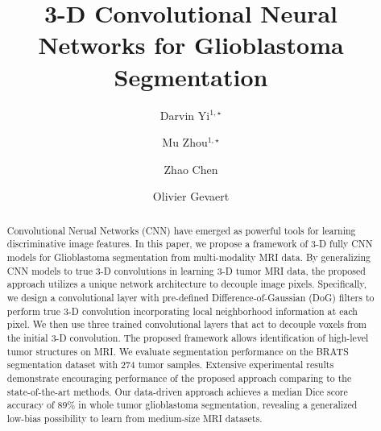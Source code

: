 \documentclass{llncs}
\begin{document}
\newcommand\blfootnote[1]{%
  \begingroup
  \renewcommand\thefootnote{}\footnote{#1}%
  \addtocounter{footnote}{-1}%
  \endgroup
}


\mainmatter              %
\title{3-D Convolutional Neural Networks for Glioblastoma Segmentation}
\author{Darvin Yi$^{1,\star}$ \and Mu Zhou$^{1,\star}$ \and Zhao Chen \and Olivier Gevaert}

\maketitle              %

\begin{abstract}
Convolutional Nerual Networks (CNN) have emerged as powerful tools for learning discriminative image features. In this paper, we propose a framework of 3-D fully CNN models for Glioblastoma segmentation from multi-modality MRI data. By generalizing CNN models to true 3-D convolutions in learning 3-D tumor MRI data, the proposed approach utilizes a unique network architecture to decouple image pixels. Specifically, we design a convolutional layer with pre-defined Difference-of-Gaussian (DoG) filters to perform true 3-D convolution incorporating local neighborhood information at each pixel. We then use three trained convolutional layers that act to decouple voxels from the initial 3-D convolution. The proposed framework allows identification of high-level tumor structures on MRI. We evaluate segmentation performance on the BRATS segmentation dataset with 274 tumor samples. Extensive experimental results demonstrate encouraging performance of the proposed approach comparing to the state-of-the-art methods. Our data-driven approach achieves a median Dice score accuracy of 89\% in whole tumor glioblastoma segmentation, revealing a generalized low-bias possibility to learn from medium-size MRI datasets.

\end{abstract}
\end{document}
